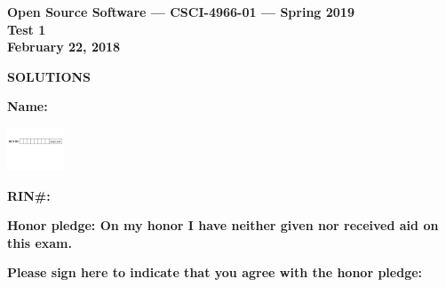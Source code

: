 \documentclass[10pt]{article}
\begin{document}
\thispagestyle{empty}

\vspace*{0.5in}

\begin{center}
\Large
\textbf{Open Source Software --- CSCI-4966-01 --- Spring 2019} \\
\textbf{Test 1} \\
\textbf{February 22, 2018}
\end{center}


\beginanswers
\begin{center}
\Large
\textbf{SOLUTIONS}
\end{center}

\else


\begin{center}

\textbf{\Large Name:} \underline {\hspace{2.0in}} \\

\bigskip
\bigskip

\centerline{
\includegraphics[height=0.5in]{boxes}
}


\bigskip

\textbf{\Large RIN\#:} \underline {\hspace{1.5in}}  

\vspace*{0.4in}
{\large\bf Honor pledge: On my honor I have neither given
nor received aid on this exam.}

\vspace*{0.1in}
{\large\bf Please sign here to indicate that you agree with the honor pledge: \underline {\hspace{1.5in}}}
\end{center}
\end{document}
